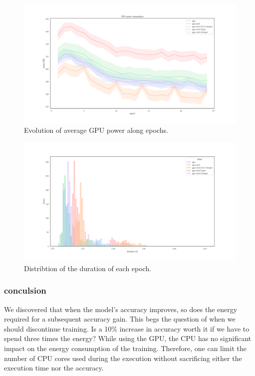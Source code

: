\begin{figure}
    \centering
    \includegraphics[width=\linewidth]{imgs/power_gpu_baedonepoche.pdf}
    \caption{Evolution of average GPU power along epochs.}
    \label{fig:ephoch_power}
\end{figure}


\begin{figure}
    \centering
    \includegraphics[width=\linewidth]{imgs/epoch_duration.pdf}
    \caption{Distribtion of the duration of each epoch.}
    \label{fig:epoch_duration}
\end{figure}
\subsubsection{conculsion}
We discovered that when the model's accuracy improves, so does the energy required for a subsequent accuracy gain.
This begs the question of when we should discontinue training.
Is a 10\% increase in accuracy worth it if we have to spend three times the energy?
While using the GPU, the CPU has no significant impact on the energy consumption of the training. Therefore, one can limit the number of CPU cores used during the execution without sacrificing either the execution time nor the accuracy.



